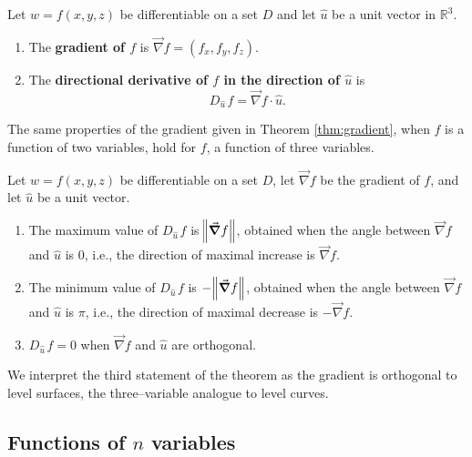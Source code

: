 \begin{definition}\label{def:direct_deriv3}
Let $w=f(x,y,z)$ be differentiable on a set $D$ and let $\hat u $ be a unit vector in $\mathbb{R}^3$.
\begin{enumerate}
	\item	The \textbf{gradient of $f$} is $\vec{\nabla} f = \left(f_x,f_y,f_z\right)$.
	\item The \textbf{directional derivative of $f$ in the direction of $\hat u$} is $$D_{\hat u\,}f=\vec{\nabla} f\cdot \hat u.$$
\end{enumerate}
\end{definition}

The same properties of the gradient given in Theorem \ref{thm:gradient}, when $f$ is a function of two variables, hold for $f$, a function of three variables.

\begin{theorem}\label{thm:gradient3}
Let $w=f(x,y,z)$ be differentiable on a set $D$, let $\vec{\nabla} f$ be the gradient of $f$, and let $\hat u$ be a unit vector.
\begin{enumerate}
	\item The maximum value of $D_{\hat u\,}f$ is $\norm{\vec{\nabla} f}$, obtained when the angle between $\vec{\nabla} f$ and $\hat u$ is 0, i.e.,  the direction of maximal increase is $\vec{\nabla} f$.
	\item The minimum value of $D_{\hat u\,}f$ is $-\norm{\vec{\nabla} f}$, obtained when the angle between $\vec{\nabla} f$ and $\hat u$ is $\pi$, i.e., the direction of maximal decrease is $-\vec{\nabla} f$.
	\item $D_{\hat u\,}f = 0$ when $\vec{\nabla} f$ and $\hat u$ are orthogonal.
\end{enumerate}
\end{theorem}

We interpret the third statement of the theorem as the gradient is orthogonal to level surfaces, the three--variable analogue to level curves.

\fi

\ifanalysis
\subsection{Functions of $n$ variables}

